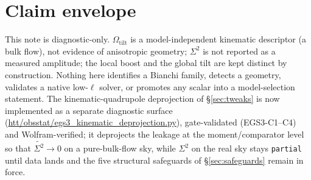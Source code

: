 \documentclass[11pt]{article}
\newcommand{\code}[1]{\texttt{\small #1}}
\newcommand{\pathx}[1]{{\small\urlstyle{tt}\url{#1}}}  %
\newcommand{\Sig}{\Sigma^2}
\newcommand{\Otilt}{\Omega_{\mathrm{tilt}}}
\begin{document}
\section{Claim envelope}
This note is diagnostic-only. $\Otilt$ is a model-independent kinematic
descriptor (a bulk flow), not evidence of anisotropic geometry; $\Sig$ is not
reported as a measured amplitude; the local boost and the global tilt are kept
distinct by construction. Nothing here identifies a Bianchi family, detects a
geometry, validates a native low-$\ell$ solver, or promotes any scalar into a
model-selection statement. The kinematic-quadrupole deprojection of
\S\ref{sec:tweaks} is now implemented as a separate diagnostic surface
(\pathx{htt/obsstat/egs3_kinematic_deprojection.py}), gate-validated
(EGS3-C1--C4) and Wolfram-verified; it deprojects the leakage at the
moment/comparator level so that $\widetilde{\Sig}\to0$ on a pure-bulk-flow sky,
while $\Sig$ on the real sky stays \code{partial} until data lands and the five
structural safeguards of \S\ref{sec:safeguards} remain in force.
\end{document}
